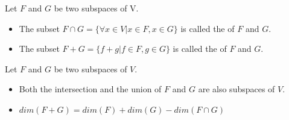       \par Let $F$ and $G$ be two subspaces of V.
      \begin{itemize}
        \item The subset $F \cap G = \{\forall x \in V | x \in F, x \in G\}$ is
          called the  of $F$ and $G$.
        \item The subset $F + G = \{f + g | f \in F, g \in G\}$ is
          called the  of $F$ and $G$.
      \end{itemize}
      \par Let $F$ and $G$ be two subspaces of $V$.
      \begin{itemize}
        \item Both the intersection and the union of $F$ and $G$ are also
          subspaces of $V$.
        \item $dim(F + G) = dim(F) + dim(G) - dim(F \cap G)$
      \end{itemize}
